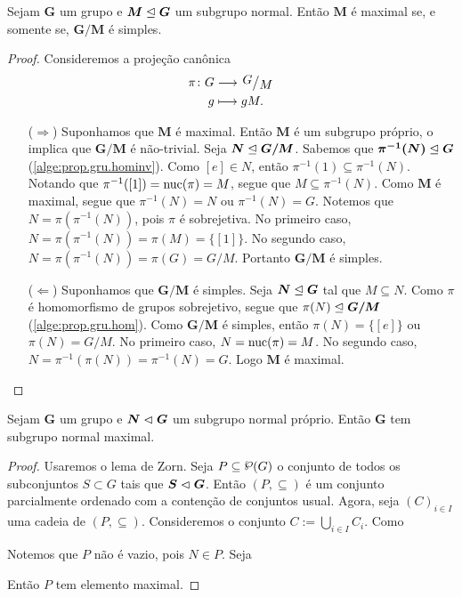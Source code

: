 \begin{proposition}
Sejam $\bm G$ um grupo e $\bm M \mathrel{\unlhd} \bm G$ um subgrupo normal. Então $\bm M$ é maximal se, e somente se, $\bm{G/M}$ é simples.
\end{proposition}
\begin{proof} Consideremos a projeção canônica
	\begin{align*}
	\func{\pi}{G}{\quo{G}{M}}{g}{gM}.
	\end{align*}
	\begin{enumerate}
		\item [($\Rightarrow$)] Suponhamos que $\bm M$ é maximal. Então $\bm M$ é um subgrupo próprio, o implica que $\bm{G/M}$ é não-trivial. Seja $\bm N \mathrel{\unlhd} \bm{G/M}$. Sabemos que $\bm{\pi^{-1}(N)} \mathrel{\unlhd} \bm G$ (\ref{alge:prop.gru.hominv}). Como $[e] \in N$, então $\pi^{-1}(1) \subseteq \pi^{-1}(N)$. Notando que $\pi^{-1}([1])=\operatorname{nuc}(\pi) = M$, segue que $M \subseteq \pi^{-1}(N)$. Como $\bm M$ é maximal, segue que $\pi^{-1}(N) = N$ ou $\pi^{-1}(N) = G$. Notemos que $N=\pi(\pi^{-1}(N))$, pois $\pi$ é sobrejetiva. No primeiro caso, $N = \pi(\pi^{-1}(N)) = \pi(M) = \{[1]\}$. No segundo caso, $N = \pi(\pi^{-1}(N)) = \pi(G) = G/M$. Portanto $\bm{G/M}$ é simples.

		\item [($\Leftarrow$)] Suponhamos que $\bm{G/M}$ é simples. Seja $\bm N \mathrel{\unlhd} \bm G$ tal que $M \subseteq N$. Como $\pi$ é homomorfismo de grupos sobrejetivo, segue que $\pi(N) \mathrel{\unlhd} \bm{G/M}$ (\ref{alge:prop.gru.hom}). Como $\bm{G/M}$ é simples, então $\pi(N) = \{[e]\}$ ou $\pi(N) = G/M$. No primeiro caso, $N = \operatorname{nuc}(\pi) = M$. No segundo caso, $N = \pi^{-1}(\pi(N)) = \pi^{-1}(N) = G$. Logo $\bm M$ é maximal.
	\end{enumerate}
\end{proof}

\begin{conjecture}
Sejam $\bm G$ um grupo e $\bm N \mathrel{\lhd} \bm G$ um subgrupo normal próprio. Então $\bm G$ tem subgrupo normal maximal.
\end{conjecture}
\begin{proof}
Usaremos o lema de Zorn. Seja $P \subseteq \p(G)$ o conjunto de todos os subconjuntos $S \subset G$ tais que $\bm S \mathrel{\lhd} \bm G$. Então $(P,\subseteq)$ é um conjunto parcialmente ordenado com a contenção de conjuntos usual. Agora, seja $(C)_{i \in I}$ uma cadeia de $(P,\subseteq)$. Consideremos o conjunto $C := \bigcup_{i \in I} C_i$. Como

Notemos que $P$ não é vazio, pois $N \in P$. Seja



Então $P$ tem elemento maximal.
\end{proof}






